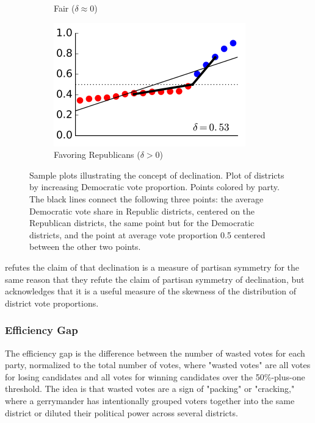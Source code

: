 \begin{figure}
\begin{subfigure}[b]{0.3\textwidth}
        \caption{Fair ($\delta \approx 0$)}
        \label{fig:dec.flat}
    \end{subfigure}
    \begin{subfigure}[b]{0.3\textwidth}
        \centering
        \includegraphics[width=\textwidth]{img/dec.repub.PNG}
        \caption{Favoring Republicans ($\delta > 0$)}
        \label{fig:dec.repub}
    \end{subfigure}
    \caption{Sample plots illustrating the concept of declination. Plot of districts by increasing Democratic vote proportion. Points colored by party. The black lines connect the following three points: the average Democratic vote share in Republic districts, centered on the Republican districts, the same point but for the Democratic districts, and the point at average vote proportion 0.5 centered between the other two points. \parencite[6]{warrington2018}}
    \label{fig:dec}
\end{figure}

\textcite{katz2020} refutes the claim of \textcite{warrington2018} that declination is a measure of partisan symmetry for the same reason that they refute the claim of partisan symmetry of declination, but acknowledges that it is a useful measure of the skewness of the distribution of district vote proportions. 

\subsubsection{Efficiency Gap} 

The efficiency gap is the difference between the number of wasted votes for each party, normalized to the total number of votes, where "wasted votes" are all votes for losing candidates and all votes for winning candidates over the 50\%-plus-one threshold. The idea is that wasted votes are a sign of "packing" or "cracking," where a gerrymander has intentionally grouped voters together into the same district or diluted their political power across several districts. \parencite{stephanopoulos2014}

